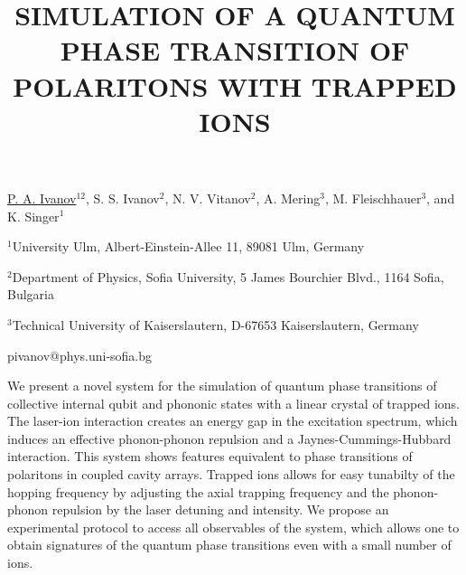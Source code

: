 \title{SIMULATION OF A QUANTUM PHASE TRANSITION OF \mbox{POLARITONS} WITH TRAPPED IONS}

\underline{P. A. Ivanov}$^{12}$, S. S. Ivanov$^{2}$, N. V.
Vitanov$^{2}$, A. Mering$^{3}$, M. Fleischhauer$^{3}$, and K.
Singer$^{1}$   
  

{\normalsize{\vspace{-4mm} $^1$University Ulm, Albert-Einstein-Allee 11, 89081
Ulm, Germany

\vspace{-4mm} $^2$Department of Physics, Sofia University, 5 James
Bourchier Blvd., 1164 Sofia, Bulgaria

\vspace{-4mm} $^3$Technical University of Kaiserslautern, D-67653
Kaiserslautern, Germany

\email pivanov@phys.uni-sofia.bg}}

We present a novel system for the simulation of quantum phase transitions of collective internal qubit and phononic states with a linear crystal of trapped ions.
The laser-ion interaction creates an energy gap in the excitation spectrum, which induces an effective phonon-phonon repulsion and a Jaynes-Cummings-Hubbard interaction.
This system shows features equivalent to phase transitions of polaritons in coupled cavity arrays.
Trapped ions allows for easy tunabilty of the hopping frequency by adjusting the axial trapping frequency and the phonon-phonon repulsion by the laser detuning and intensity.
We propose an experimental protocol to access all observables of the system, which allows one to obtain signatures of the quantum phase transitions even with a small number of ions.

